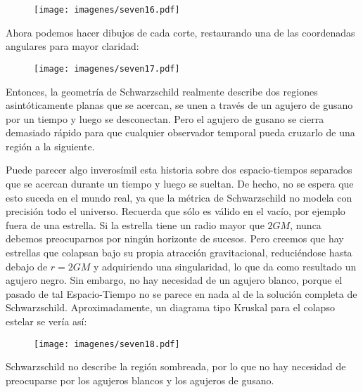 \documentclass[11pt,b5paper,openany,twoside]{book}
\begin{document}
\begin{figure}[h]
\centering
\texttt{[image: imagenes/seven16.pdf]}
\end{figure}

\noindent
Ahora podemos hacer dibujos de cada corte, restaurando una de las coordenadas angulares para mayor claridad:

\begin{figure}[h]
\centering
\texttt{[image: imagenes/seven17.pdf]}
\end{figure}

\noindent
Entonces, la geometría de Schwarzschild realmente describe dos regiones asintóticamente planas que se acercan, se unen a través de un agujero de gusano por un tiempo y luego se desconectan.
Pero el agujero de gusano se cierra demasiado rápido para que cualquier observador temporal pueda cruzarlo de una región a la siguiente.

Puede parecer algo inverosímil esta historia sobre dos espacio-tiempos separados que se acercan durante un tiempo y luego se sueltan.
De hecho, no se espera que esto suceda en el mundo real, ya que la métrica de Schwarzschild no modela con precisión todo el universo.
Recuerda que sólo es válido en el vacío, por ejemplo fuera de una estrella.
Si la estrella tiene un radio mayor que $2GM$, nunca debemos preocuparnos por ningún horizonte de sucesos.
Pero creemos que hay estrellas que colapsan bajo su propia atracción gravitacional, reduciéndose hasta debajo de $r=2GM$ y adquiriendo una singularidad, lo que da como resultado un agujero negro.
Sin embargo, no hay necesidad de un agujero blanco, porque el pasado de tal Espacio-Tiempo no se parece en nada al de la solución completa de Schwarzschild.
Aproximadamente, un diagrama tipo Kruskal para el colapso estelar se vería así:

\begin{figure}[h]
\centering
\texttt{[image: imagenes/seven18.pdf]}
\end{figure}

\noindent
Schwarzschild no describe la región sombreada, por lo que no hay necesidad de preocuparse por los agujeros blancos y los agujeros de gusano.
\end{document}
